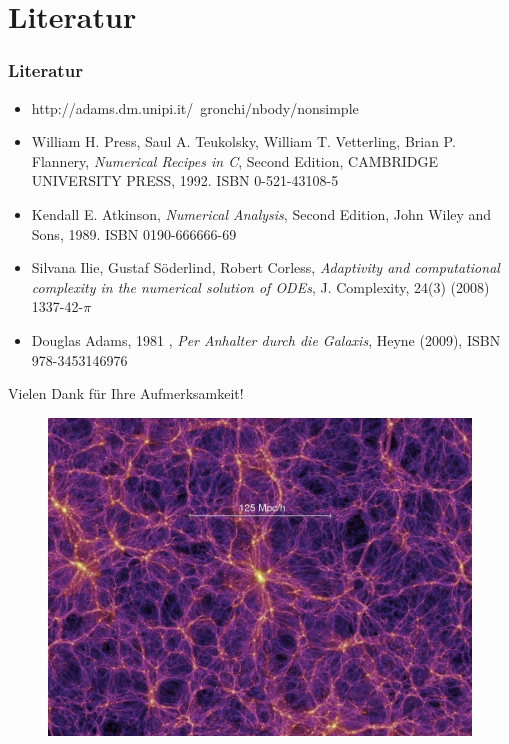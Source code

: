 \documentclass[aspectratio=169]{beamer}
\begin{document}
  \section{Literatur}
    \begin{frame}
      \frametitle{Literatur}
      \begin{itemize}
        \item http://adams.dm.unipi.it/~gronchi/nbody/nonsimple
        \item William H. Press, Saul A. Teukolsky, William T. Vetterling, Brian P. Flannery, \textit{Numerical Recipes in C}, Second Edition, CAMBRIDGE UNIVERSITY PRESS, 1992. ISBN 0-521-43108-5
        \item Kendall E. Atkinson, \textit{Numerical Analysis}, Second Edition, John Wiley and Sons, 1989. ISBN 0190-666666-69
        \item Silvana Ilie, Gustaf Söderlind, Robert Corless, \textit{Adaptivity and computational complexity in the numerical solution of ODEs}, J. Complexity, 24(3) (2008) 1337-42-$\pi$
        \item Douglas Adams, 1981 , \textit{Per Anhalter durch die Galaxis}, Heyne (2009), ISBN 978-3453146976
      \end{itemize}
    \end{frame}
    \begin{frame}
      \vfill
      \centering \color{white} Vielen Dank für Ihre Aufmerksamkeit!
      \begin{figure}
        \center
        \includegraphics[scale=0.3]{millenium.jpg}
      \end{figure}
      \vfill
    \end{frame}
\end{document}

